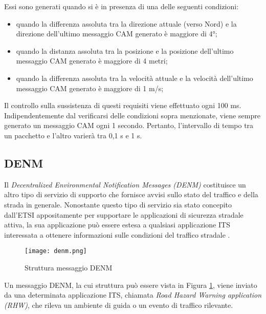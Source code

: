 Essi sono generati quando si è in presenza di una delle seguenti condizioni:

\begin{itemize}
    \item quando la differenza assoluta tra la direzione attuale (verso Nord) e la direzione dell'ultimo messaggio CAM generato è maggiore di 4°;
    \item quando la distanza assoluta tra la posizione e la posizione dell'ultimo messaggio CAM generato è maggiore di 4 metri;
    \item quando la differenza assoluta tra la velocità attuale e la velocità dell'ultimo messaggio CAM generato è maggiore di 1 m/s;
\end{itemize}

Il controllo sulla sussistenza di questi requisiti viene effettuato ogni 100 ms. Indipendentemente dal verificarsi delle condizioni sopra menzionate, viene sempre generato un messaggio CAM ogni 1 secondo. Pertanto, l'intervallo di tempo tra un pacchetto e l'altro varierà tra 0,1 s e 1 s.

\subsection[DENM]{DENM}
Il \textit{Decentralized Environmental Notification Messages (DENM)} costituisce un altro tipo di servizio di supporto che fornisce avvisi sullo stato del traffico e della strada in generale. Nonostante questo tipo di servizio sia stato concepito dall'ETSI appositamente per supportare le applicazioni di sicurezza stradale attiva, la sua applicazione può essere estesa a qualsiasi applicazione ITS interessata a ottenere informazioni sulle condizioni del traffico stradale \cite{etsi2010etsi}.

\begin{figure}[h!]
    \centering
    \texttt{[image: denm.png]}
    \caption{Struttura messaggio DENM}
    \label{fig:denm}
\end{figure}

Un messaggio DENM, la cui struttura può essere vista in Figura \ref{fig:denm}, viene inviato da una determinata applicazione ITS, chiamata \textit{Road Hazard Warning application (RHW)}, che rileva un ambiente di guida o un evento di traffico rilevante.


